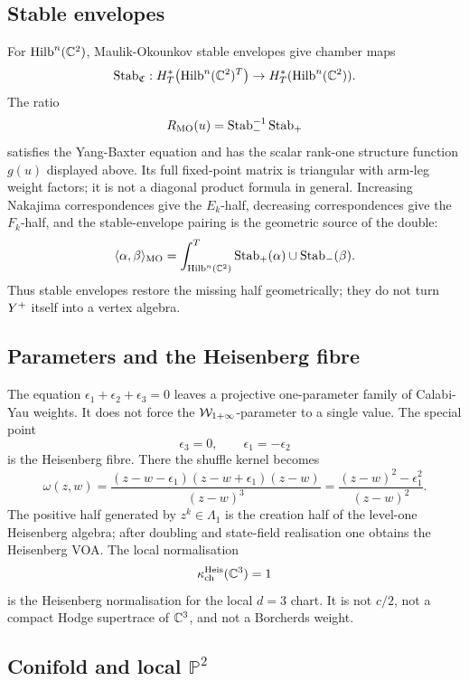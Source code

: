 \subsection*{Stable envelopes}

For \(\mathrm{Hilb}^n(\mathbb{C}^2)\), Maulik-Okounkov stable envelopes give chamber
maps
\[
  \operatorname{Stab}_{\mathfrak C}:
  H^*_T\bigl(\mathrm{Hilb}^n(\mathbb{C}^2)^T\bigr)\to H^*_T(\mathrm{Hilb}^n(\mathbb{C}^2)).
\]
The ratio
\[
  R_{\mathrm{MO}}(u)=\operatorname{Stab}_{-}^{-1}\operatorname{Stab}_{+}
\]
satisfies the Yang-Baxter equation and has the scalar rank-one
structure function \(g(u)\) displayed above.  Its full fixed-point
matrix is triangular with arm-leg weight factors; it is not a diagonal
product formula in general.  Increasing Nakajima correspondences give
the \(E_k\)-half, decreasing correspondences give the \(F_k\)-half, and
the stable-envelope pairing is the geometric source of the double:
\[
  \langle \alpha,\beta\rangle_{\mathrm{MO}}
  =
  \int_{\mathrm{Hilb}^n(\mathbb{C}^2)}^T
  \operatorname{Stab}_{+}(\alpha)\cup
  \operatorname{Stab}_{-}(\beta).
\]
Thus stable envelopes restore the missing half geometrically; they do
not turn \(Y^{+}\) itself into a vertex algebra.

\subsection*{Parameters and the Heisenberg fibre}

The equation \(\epsilon_1+\epsilon_2+\epsilon_3=0\) leaves a projective
one-parameter family of Calabi-Yau weights.  It does not force the
\(\mathcal{W}_{1+\infty}\)-parameter to a single value.  The special point
\[
  \epsilon_3=0,\qquad \epsilon_1=-\epsilon_2
\]
is the Heisenberg fibre.  There the shuffle kernel becomes
\[
  \omega(z,w)
  =
  \frac{(z-w-\epsilon_1)(z-w+\epsilon_1)(z-w)}
       {(z-w)^3}
  =
  \frac{(z-w)^2-\epsilon_1^2}{(z-w)^2}.
\]
The positive half generated by \(z^k\in\Lambda_1\) is the creation
half of the level-one Heisenberg algebra; after doubling and
state-field realisation one obtains the Heisenberg VOA\@.  The local
normalisation
\[
  \kappa_{\mathrm{ch}}^{\mathrm{Heis}}(\mathbb{C}^3)=1
\]
is the Heisenberg normalisation for the local \(d=3\) chart.
It is not \(c/2\), not a compact Hodge supertrace of \(\mathbb{C}^3\), and not
a Borcherds weight.

\subsection*{Conifold and local \texorpdfstring{$\mathbb P^2$}{P2}}

